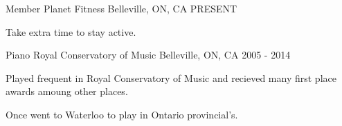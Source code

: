 

\begin{cventries}

  \cventry
    {Member} %
    {Planet Fitness} %
    {Belleville, ON, CA} %
    {PRESENT} %
    {
      \begin{cvitems} %
        \item {Take extra time to stay active.}
      \end{cvitems}
    }

  \cventry
    {Piano} %
    {Royal Conservatory of Music} %
    {Belleville, ON, CA} %
    {2005 - 2014} %
    {
      \begin{cvitems} %
        \item {Played frequent in Royal Conservatory of Music and recieved many first place awards amoung other places.}
        \item {Once went to Waterloo to play in Ontario provincial's.}
      \end{cvitems}
    }

\end{cventries}
